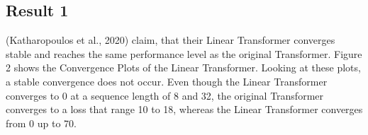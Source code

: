 \documentclass[DIV=13,fontsize=11pt]{scrartcl}
\begin{document}







\subsection{Result 1}
(Katharopoulos et al., 2020) claim, that their Linear Transformer converges stable and reaches the same performance level as the original Transformer.  Figure 2 shows the Convergence Plots of the Linear Transformer. Looking at these plots, a stable convergence does not occur.  Even though the Linear Transformer converges to 0 at a sequence length of 8 and 32, the original Transformer converges to a loss that range 10 to 18, whereas the Linear Transformer converges from 0 up to 70.  
\end{document}

